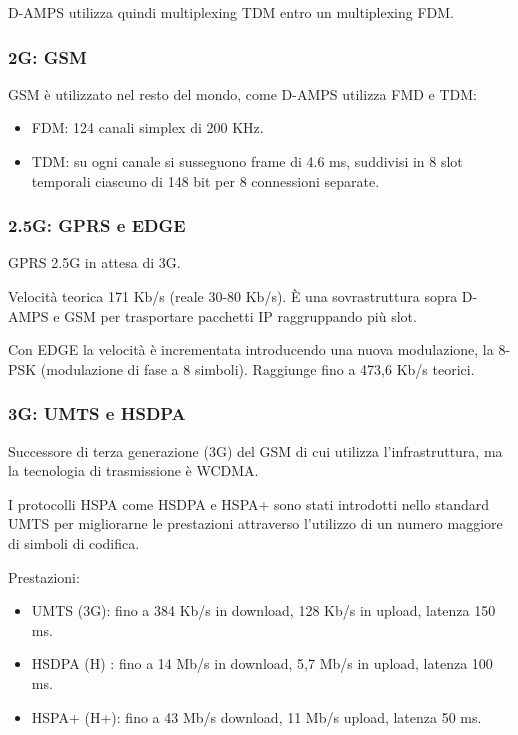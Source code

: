             D-AMPS utilizza quindi multiplexing TDM entro un multiplexing FDM.

        \subsubsection{2G: GSM}
            GSM è utilizzato nel resto del mondo, come D-AMPS utilizza FMD e TDM:
            \begin{itemize}
                \item FDM: 124 canali simplex di 200 KHz.
                \item TDM: su ogni canale si susseguono frame di 4.6 ms, suddivisi in 8 slot temporali ciascuno di 148 bit per 8 connessioni separate.
            \end{itemize}

        \subsubsection{2.5G: GPRS e EDGE}
            GPRS 2.5G in attesa di 3G.

            Velocità teorica 171 Kb/s (reale 30-80 Kb/s). È una sovrastruttura sopra D-AMPS e GSM per trasportare pacchetti IP raggruppando più slot.

            Con EDGE la velocità è incrementata introducendo una nuova modulazione, la 8-PSK (modulazione di fase a 8 simboli). Raggiunge fino a 473,6 Kb/s teorici.

        \subsubsection{3G: UMTS e HSDPA}
            Successore di terza generazione (3G) del GSM di cui utilizza l'infrastruttura, ma la tecnologia di trasmissione è WCDMA.
        
            I protocolli HSPA come HSDPA e HSPA+ sono stati introdotti nello standard UMTS per migliorarne le prestazioni attraverso l’utilizzo di un numero maggiore di simboli di codifica.
        
            Prestazioni:
            \begin{itemize}
                \item UMTS (3G): fino a 384 Kb/s in download, 128 Kb/s in upload, latenza 150 ms.
                \item HSDPA (H) : fino a 14 Mb/s in download, 5,7 Mb/s in upload, latenza 100 ms.
                \item HSPA+ (H+): fino a 43 Mb/s download, 11 Mb/s upload, latenza 50 ms.
            \end{itemize}

